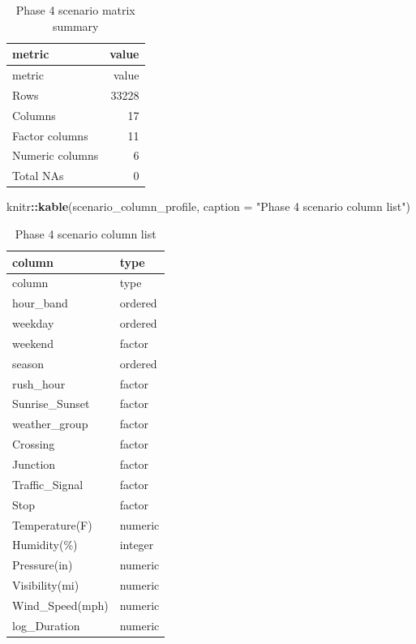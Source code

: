 \documentclass[
]{article}
\newenvironment{Shaded}{\begin{snugshade}}{\end{snugshade}}
\newcommand{\AttributeTok}[1]{\textcolor[rgb]{0.13,0.29,0.53}{#1}}
\newcommand{\FunctionTok}[1]{\textcolor[rgb]{0.13,0.29,0.53}{\textbf{#1}}}
\newcommand{\NormalTok}[1]{#1}
\newcommand{\SpecialCharTok}[1]{\textcolor[rgb]{0.81,0.36,0.00}{\textbf{#1}}}
\newcommand{\StringTok}[1]{\textcolor[rgb]{0.31,0.60,0.02}{#1}}
\begin{document}
\begin{longtable}[]{@{}lr@{}}
\caption{Phase 4 scenario matrix summary}\tabularnewline
\toprule\noalign{}
metric & value \\
\midrule\noalign{}
\endfirsthead
\toprule\noalign{}
metric & value \\
\midrule\noalign{}
\endhead
\bottomrule\noalign{}
\endlastfoot
Rows & 33228 \\
Columns & 17 \\
Factor columns & 11 \\
Numeric columns & 6 \\
Total NAs & 0 \\
\end{longtable}

\begin{Shaded}
\begin{Highlighting}[]
\NormalTok{knitr}\SpecialCharTok{::}\FunctionTok{kable}\NormalTok{(scenario\_column\_profile, }\AttributeTok{caption =} \StringTok{"Phase 4 scenario column list"}\NormalTok{)}
\end{Highlighting}
\end{Shaded}

\begin{longtable}[]{@{}ll@{}}
\caption{Phase 4 scenario column list}\tabularnewline
\toprule\noalign{}
column & type \\
\midrule\noalign{}
\endfirsthead
\toprule\noalign{}
column & type \\
\midrule\noalign{}
\endhead
\bottomrule\noalign{}
\endlastfoot
hour\_band & ordered \\
weekday & ordered \\
weekend & factor \\
season & ordered \\
rush\_hour & factor \\
Sunrise\_Sunset & factor \\
weather\_group & factor \\
Crossing & factor \\
Junction & factor \\
Traffic\_Signal & factor \\
Stop & factor \\
Temperature(F) & numeric \\
Humidity(\%) & integer \\
Pressure(in) & numeric \\
Visibility(mi) & numeric \\
Wind\_Speed(mph) & numeric \\
log\_Duration & numeric \\
\end{longtable}
\end{document}
